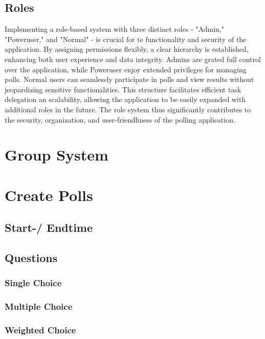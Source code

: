 \documentclass[a4paper,12pt]{report}
\begin{document}
\subsection{Roles}
Implementing a role-based system with three distinct roles - "Admin," "Poweruser," and "Normal" - is crucial for te functionality and security of the application. By assigning permissions flexibly, a clear hierarchy is established, enhancing both user experience and data integrity. Admins are grated full control over the application, while Poweruser enjoy extended privileges for managing polls. Normal users can seamlessly participate in polls and view results without jeopardizing sensitive functionalities. This structure facilitates efficient task delegation an scalability, allowing the application to be easily expanded with additional roles  in the future. The role system thus significantly contributes to the security, organization, and user-friendliness of the polling application.
\section{Group System}
\section{Create Polls}
\subsection{Start-/ Endtime}
\subsection{Questions}
\subsubsection{Single Choice}
\subsubsection{Multiple Choice}
\subsubsection{Weighted Choice}
\end{document}
